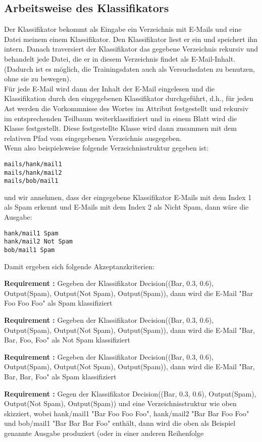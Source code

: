 \documentclass{article}
\newcounter{requirementscount}{}
\newcommand{\requirement}[1] {
        \addtocounter{requirementscount}{1}
        {\bf Requirement \therequirementscount:} #1\\
    }
\begin{document}
\subsection{Arbeitsweise des Klassifikators}
Der Klassifikator bekommt als Eingabe ein Verzeichnis mit E-Mails und eine
Datei meinem einem Klassifikator. Den Klassifikator liest er ein und
speichert ihn intern. Danach traversiert der Klassifikator das gegebene
Verzeichnis rekursiv und behandelt jede Datei, die er in diesem Verzeichnis
findet als E-Mail-Inhalt. (Dadurch ist es m\"oglich, die Trainingsdaten auch
als Versuchsdaten zu benutzen, ohne sie zu bewegen).\\
F\"ur jede E-Mail wird dann der Inhalt der E-Mail eingelesen und die
Klassifikation durch den eingegebenen Klassifikator durchgef\"uhrt, d.h., 
f\"ur jeden Ast werden die Vorkommnisse des Wortes im Attribut
festgestellt und rekursiv im entsprechenden Teilbaum weiterklassifiziert
und in einem Blatt wird die Klasse festgestellt. Diese festgestellte Klasse
wird dann zusammen mit dem relativen Pfad vom eingegebenen Verzeichnis
ausgegeben.\\
Wenn also beispielsweise folgende Verzeichnisstruktur gegeben ist:
\begin{verbatim}
mails/hank/mail1
mails/hank/mail2
mails/bob/mail1
\end{verbatim}
und wir annehmen, dass der eingegebene Klassifikator E-Mails mit dem Index
1 als Spam erkennt und E-Mails mit dem Index 2 als Nicht Spam, dann
w\"are die Ausgabe:
\begin{verbatim}
hank/mail1 Spam
hank/mail2 Not Spam
bob/mail1 Spam
\end{verbatim}
Damit ergeben sich folgende Akzeptanzkriterien:\\
\requirement{Gegeben der Klassifikator Decision((Bar, 0.3, 0.6), Output(Spam),
Output(Not Spam), Output(Spam)), dann wird die E-Mail "Bar Foo Foo Foo" als
Spam klassifiziert}
\requirement{Gegeben der Klassifikator Decision((Bar, 0.3, 0.6), Output(Spam),
Output(Not Spam), Output(Spam)), dann wird die E-Mail "Bar, Bar, Foo, Foo" als
Not Spam klassifiziert}
\requirement{Gegeben der Klassifikator Decision((Bar, 0.3, 0.6), Output(Spam),
Output(Not Spam), Output(Spam)), dann wird die E-Mail "Bar, Bar, Bar, Foo" als
Spam klassifiziert}
\requirement{Gegen der Klassifikator Decision((Bar, 0.3, 0.6), Output(Spam),
Output(Not Spam), Output(Spam)) und eine Verzeichnisstruktur wie oben
skizziert, wobei hank/mail1 "Bar Foo Foo Foo", hank/mail2 "Bar Bar Foo Foo"
und bob/mail1 "Bar Bar Bar Foo" enth\"alt, dann wird die oben als Beispiel
genannte Ausgabe produziert (oder in einer anderen Reihenfolge}
\end{document}
